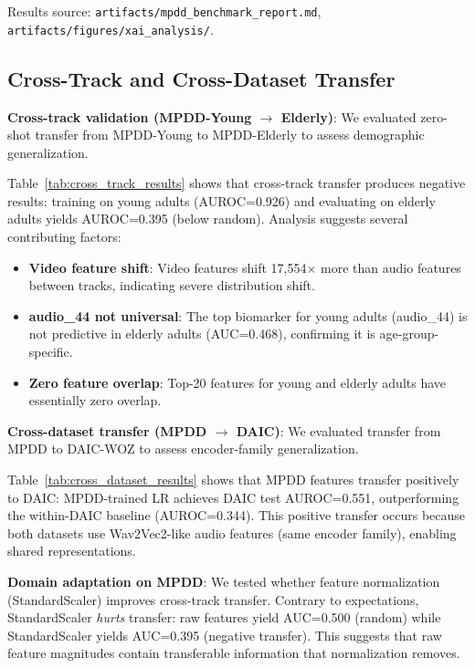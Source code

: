 \documentclass[12pt,oneside]{book}
\begin{document}
Results source: \texttt{artifacts/mpdd\_benchmark\_report.md}, \texttt{artifacts/figures/xai\_analysis/}.

\subsection{Cross-Track and Cross-Dataset Transfer}
\label{sec:cross_transfer}

\textbf{Cross-track validation (MPDD-Young $\rightarrow$ Elderly)}: We evaluated zero-shot transfer from MPDD-Young to MPDD-Elderly to assess demographic generalization.



Table~\ref{tab:cross_track_results} shows that cross-track transfer produces negative results: training on young adults (AUROC=0.926) and evaluating on elderly adults yields AUROC=0.395 (below random). Analysis suggests several contributing factors:
\begin{itemize}
    \item \textbf{Video feature shift}: Video features shift 17,554$\times$ more than audio features between tracks, indicating severe distribution shift.
    \item \textbf{audio\_44 not universal}: The top biomarker for young adults (audio\_44) is not predictive in elderly adults (AUC=0.468), confirming it is age-group-specific.
    \item \textbf{Zero feature overlap}: Top-20 features for young and elderly adults have essentially zero overlap.
\end{itemize}

\textbf{Cross-dataset transfer (MPDD $\rightarrow$ DAIC)}: We evaluated transfer from MPDD to DAIC-WOZ to assess encoder-family generalization.



Table~\ref{tab:cross_dataset_results} shows that MPDD features transfer positively to DAIC: MPDD-trained LR achieves DAIC test AUROC=0.551, outperforming the within-DAIC baseline (AUROC=0.344). This positive transfer occurs because both datasets use Wav2Vec2-like audio features (same encoder family), enabling shared representations.

\textbf{Domain adaptation on MPDD}: We tested whether feature normalization (StandardScaler) improves cross-track transfer. Contrary to expectations, StandardScaler \emph{hurts} transfer: raw features yield AUC=0.500 (random) while StandardScaler yields AUC=0.395 (negative transfer). This suggests that raw feature magnitudes contain transferable information that normalization removes.
\end{document}
